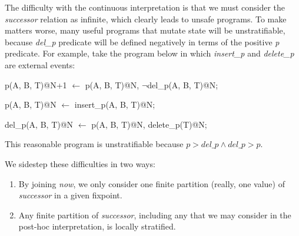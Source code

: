 The difficulty with the continuous interpretation is that we must consider the \emph{successor} relation as infinite, which clearly leads
to unsafe programs.  To make matters worse, many useful programs that mutate state will be unstratifiable, because \emph{del\_p} predicate
will be defined negatively in terms of the positive \emph{p} predicate.  For example, take the program below in which \emph{insert\_p}
and \emph{delete\_p} are external events:

\begin{Dedalus}
p(A, B, T)@N+1 \(\leftarrow\)
  p(A, B, T)@N,
  \(\lnot\)del\_p(A, B, T)@N;
  
  
p(A, B, T)@N \(\leftarrow\)
  insert\_p(A, B, T)@N;
  
del_p(A, B, T)@N \(\leftarrow\)
  p(A, B, T)@N,
  delete\_p(T)@N;
\end{Dedalus}

This reasonable program is unstratifiable because $p > del\_p \land del\_p > p$.  

We sidestep these difficulties in two ways:

\begin{enumerate}
\item By joining \emph{now}, we only consider one finite partition (really, one value) of \emph{successor} in a given fixpoint.
\item Any finite partition of \emph{successor}, including any that we may consider in the post-hoc interpretation, is locally stratified. 
\end{enumerate}
